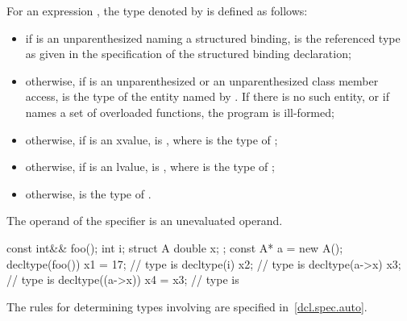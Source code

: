 \pnum
{}%
For an expression , the type denoted by  is defined as follows:

\begin{itemize}
\item if  is an unparenthesized 
naming a structured binding,
 is the referenced type as given in
the specification of the structured binding declaration;

\item otherwise, if  is an unparenthesized  or
an unparenthesized
class
member access,  is the
type of the entity named by . If there is no such entity, or
if  names a set of overloaded functions, the program is
ill-formed;

\item otherwise, if  is
an xvalue,  is , where  is the type
of ;

\item otherwise, if  is an lvalue, 
is , where  is the type of ;

\item otherwise,  is the type of .
\end{itemize}

The operand of the  specifier is an unevaluated
operand.

\begin{example}
\begin{codeblock}
const int&& foo();
int i;
struct A { double x; };
const A* a = new A();
decltype(foo()) x1 = 17;        // type is 
decltype(i) x2;                 // type is 
decltype(a->x) x3;              // type is 
decltype((a->x)) x4 = x3;       // type is 
\end{codeblock}
\end{example}
\begin{note}
The rules for determining types involving  are specified
in~\ref{dcl.spec.auto}.
\end{note}

